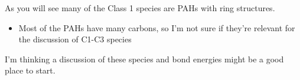 \documentclass{article}
\begin{document}
                                                                                                                                                                                                                                                                                                                                                                                                                                                                                                                                                                        

As you will see many of the Class 1 species are PAHs with ring structures.  
\begin{itemize}
    \item Most of the PAHs have many carbons, so I'm not sure if they're relevant for the discussion of C1-C3 species
\end{itemize}

I’m thinking a discussion of these species and bond energies might be a good place to start.
\end{document}
